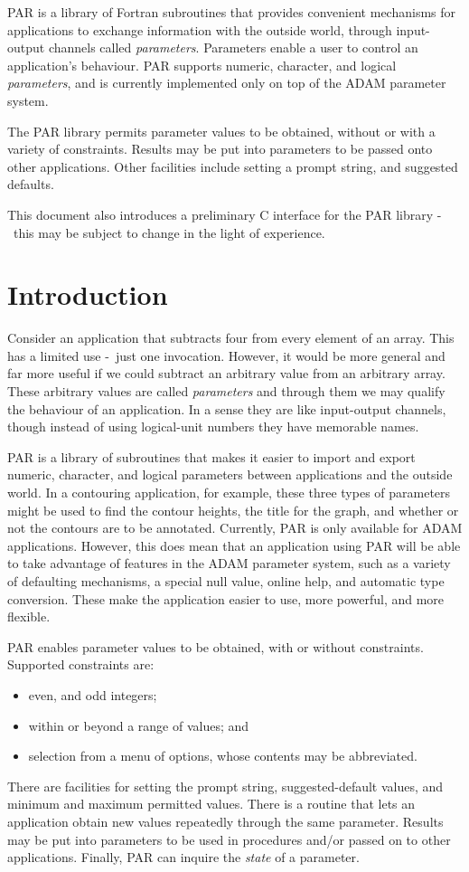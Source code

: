 \documentclass[twoside,11pt]{article}
\newcommand{\stardocinitials}  {SUN}
\newcommand{\stardocnumber}    {114.4}
\newcommand{\stardocabstract}  {PAR is a library of Fortran subroutines that 
provides convenient mechanisms for applications to exchange information with 
the outside world, through input-output channels called {\em parameters\/}.  
Parameters enable a
user to control an application's behaviour.  PAR supports numeric,
character, and logical {\em parameters}, and is currently implemented
only on top of the {\footnotesize ADAM} parameter system. 
\par
The PAR library permits parameter values to be obtained, without or with
a variety of constraints.  Results may be put into parameters to
be passed onto other applications.  Other facilities include setting a prompt
string, and suggested defaults.  
\par
This document also introduces a preliminary C interface for the PAR library
\dash\ this may be subject to change in the light of experience.

}
\newcommand{\stardocname}{\stardocinitials /\stardocnumber}
\newenvironment{latexonly}{}{}
\newcommand{\xlabel}[1]{}
\newcommand{\latexonlytoc}[0]{\tableofcontents}
\newcommand{\dash}{--}
\renewcommand{\dash}{-}
\renewcommand{\thepage}{\roman{page}}
\begin{document}
\stardocabstract
  \newpage
  \begin{latexonly}
    \setlength{\parskip}{0mm}
    \latexonlytoc
    \setlength{\parskip}{\medskipamount}
    \markboth{\stardocname}{\stardocname}
  \end{latexonly}
\cleardoublepage
\renewcommand{\thepage}{\arabic{page}}
\setcounter{page}{1}

\section{\xlabel{introduction}Introduction}

Consider an application that subtracts four from every element of an
array.  This has a limited use \dash\ just one invocation.  However, it would
be more general and far more useful if we could subtract an arbitrary
value from an arbitrary array.  These arbitrary values are called {\em
parameters\/} and through them we may qualify the behaviour of an
application.  In a sense they are like input-output channels, though
instead of using logical-unit numbers they have memorable names. 

PAR is a library of subroutines that makes it easier to import and
export numeric, character, and logical parameters between applications
and the outside world.  In a contouring application, for example, these
three types of parameters might be used to find the contour heights, the
title for the graph, and whether or not the contours are to be
annotated. Currently, PAR is only available for {\footnotesize ADAM}
applications.  However, this does mean that an application using PAR
will be able to take advantage of features in the {\footnotesize ADAM}
parameter system, such as a variety of defaulting mechanisms, a special
null value, online help, and automatic type conversion.  These make the
application easier to use, more powerful, and more flexible. 

PAR enables parameter values to be obtained, with or without
constraints.  Supported constraints are: 
\begin{itemize}
\item even, and odd integers;
\item within or beyond a range of values; and
\item selection from a menu of options,
whose contents may be abbreviated. 
\end{itemize}
There are facilities for setting the prompt string, suggested-default
values, and minimum and maximum permitted values. There is a routine
that lets an application obtain new values repeatedly through the same
parameter.  Results may be put into parameters to be used in procedures
and/or passed on to other applications.  Finally, PAR can inquire the
{\em state\/} of a parameter.
\end{document}
